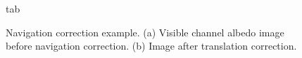 \begin{figure}
  \begin{center}
    \caption[Navigation Correction tab]{
        tab
    }
    \label{navigation_tab}
  \end{center}
\end{figure}

\begin{figure}
  \begin{center}
    \caption[Navigation correction example]{
       Navigation correction example.  (a) Visible channel albedo
       image before navigation correction.  (b) Image after
       translation correction.
    }
    \label{correction}
  \end{center}
\end{figure}

